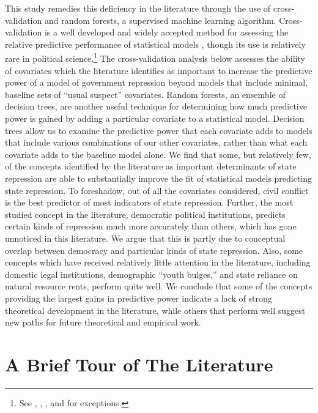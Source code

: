 \documentclass[12pt]{article}
\begin{document}
This study remedies this deficiency in the literature through the use of cross-validation and random forests, a supervised machine learning algorithm. Cross-validation is a well developed and widely accepted method for assessing the relative predictive performance of statistical models \citep[See, e.g.,][]{Geisser1975, Efron1983, PicardCook1984, HastieTibshiraniFriedman2008}, though its use is relatively rare in political science.\footnote{See \citet{HoffWard2004}, \citet{WardHoff2007}, \citet{WardSiversonCao2007}, and \citet{Wardetal2010} for exceptions.} The cross-validation analysis below assesses the ability of covariates which the literature identifies as important to increase the predictive power of a model of government repression beyond models that include minimal, baseline sets of ``usual suspect'' covariates. Random forests, an ensemble of decision trees, are another useful technique for determining how much predictive power is gained by adding a particular covariate to a statistical model. Decision trees allow us to examine the predictive power that each covariate adds to models that include various combinations of our other covariates, rather than what each covariate adds to the baseline model alone. We find that some, but relatively few, of the concepts identified by the literature as important determinants of state repression are able to substantially improve the fit of statistical models predicting state repression. To foreshadow, out of all the covariates considered, civil conflict is the best predictor of most indicators of state repression. Further, the most studied concept in the literature, democratic political institutions, predicts certain kinds of repression much more accurately than others, which has gone unnoticed in this literature. We argue that this is partly due to conceptual overlap between democracy and particular kinds of state repression. Also, some concepts which have received relatively little attention in the literature, including domestic legal institutions, demographic ``youth bulges,'' and state reliance on natural resource rents, perform quite well. We conclude that some of the concepts providing the largest gains in predictive power indicate a lack of strong theoretical development in the literature, while others that perform well suggest new paths for future theoretical and empirical work. 

\section{A Brief Tour of The Literature}
\end{document}
